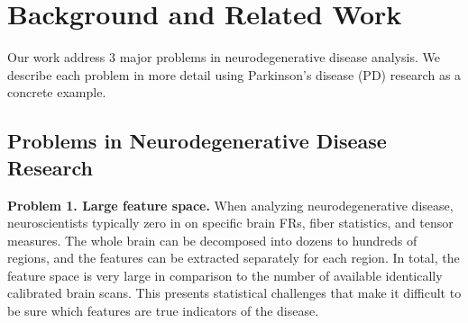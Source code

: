 
\section{Background and Related Work}
\label{sec:backgroundAndRelatedWork}



\noindent Our work address 3 major problems in %
neurodegenerative disease analysis. We describe each problem in more detail using Parkinson's disease (PD) research as a concrete example.


\subsection{Problems in Neurodegenerative Disease Research}
\label{sec:problems}

\noindent\textbf{Problem 1. Large feature space.}
When analyzing neurodegenerative disease, neuroscientists typically zero in on specific brain FRs, fiber statistics, and tensor measures. 
The whole brain
can be decomposed into dozens to hundreds of 
regions, 
and the features can be extracted 
separately
for each region. In total, the feature space is very large in  
comparison to the number of available identically calibrated brain scans.
This presents statistical challenges that make it difficult to be sure which features are true indicators of the disease.

